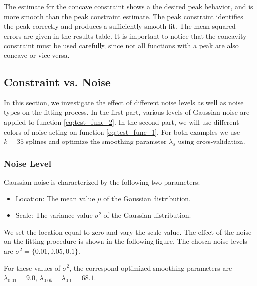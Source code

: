 \documentclass[10pt,a4paper]{article}
\begin{document}
The estimate for the concave constraint shows a the desired peak behavior, and is more smooth than the peak constraint estimate. The peak constraint identifies the peak correctly and produces a sufficiently smooth fit. The mean squared errors are given in the results table. 
It is important to notice that the concavity constraint must be used carefully, since not all functions with a peak are also concave or vice versa.

\subsection{Constraint vs. Noise}

In this section, we investigate the effect of different noise levels as well as noise types on the fitting process. In the first part, various levels of Gaussian noise are applied to function \ref{eq:test_func_2}. In the second part, we will use different colors of noise acting on function \ref{eq:test_func_1}. For both examples we use $k=35$ splines and optimize the smoothing parameter $\lambda_s$ using cross-validation. 

\subsubsection{Noise Level}

Gaussian noise is characterized by the following two parameters:
\begin{itemize}
	\item Location: The mean value $\mu$ of the Gaussian distribution.
	\item Scale: The variance value $\sigma^2$ of the Gaussian distribution.
\end{itemize}

We set the location equal to zero and vary the scale value. The effect of the noise on the fitting procedure is shown in the following figure. The chosen noise levels are $\sigma^2 = \{0.01, 0.05, 0.1\}$.

For these values of $\sigma^2$, the correspond optimized smoothing parameters are $\lambda_{0.01} = 9.0$, $\lambda_{0.05} = \lambda_{0.1} = 68.1$.
\end{document}

